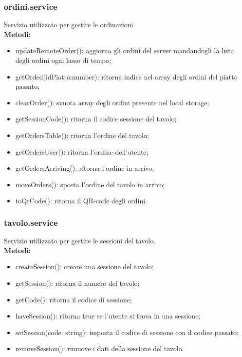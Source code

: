 \subsubsection{ordini.service}
Servizio utilizzato per gestire le ordinazioni.\\
\textbf{Metodi:}
\begin{itemize}
    \item updateRemoteOrder(): aggiorna gli ordini del server mandandogli la lista degli ordini ogni lasso di tempo;
    \item getOrded(idPiatto:number): ritorna indice nel array degli ordini del piatto passato;
    \item clearOrder(): svuota array degli ordini presente nel local storage;
    \item getSessionCode(): ritorna il codice sessione del tavolo;
    \item getOrdersTable(): ritorna l'ordine del tavolo;
    \item getOrdersUser(): ritorna l'ordine dell'utente;
    \item getOrdersArriving(): ritorna l'ordine in arrivo;
    \item moveOrders(): sposta l'ordine del tavolo in arrivo;
    \item toQrCode(): ritorna il QR-code degli ordini.
\end{itemize}

\subsubsection{tavolo.service}
Servizio utilizzato per gestire le sessioni del tavolo.\\
\textbf{Metodi:}
\begin{itemize}
    \item createSession(): creare una sessione del tavolo;
    \item getSession(): ritorna il numero del tavolo;
    \item getCode(): ritorna il codice di sessione;
    \item haveSession(): ritorna true se l'utente si trova in una sessione;
    \item setSession(code: string): imposta il codice di sessione con il codice passato;
    \item removeSession(): rimuove i dati della sessione del tavolo.
\end{itemize}



